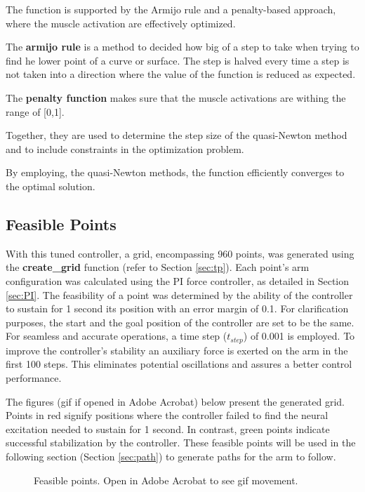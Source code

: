 The function is supported by the Armijo rule and a penalty-based approach, where the muscle activation are effectively optimized. 

The \textbf{armijo rule }is a method to decided how big of a step to take when trying to find he lower point of a curve or surface. 
The step is halved every time a step is not taken into a direction where the value of the function is reduced as expected. 

The \textbf{penalty function} makes sure that the muscle activations are withing the range of [0,1]. 

Together, they are used to determine the step size of the quasi-Newton method and to include constraints in the optimization problem. 

By employing, the quasi-Newton methods, the function efficiently converges to the optimal solution.             

\subsection{Feasible Points}
With this tuned controller, a grid, encompassing 960 points, was generated using the \textbf{create\_grid} function (refer to Section \ref{sec:tp}). Each point's arm configuration was calculated using the PI force controller, as detailed in Section \ref{sec:PI}. The feasibility of a point was determined by the ability of the controller to sustain for 1 second its position with an error margin of 0.1. For clarification purposes, the start and the goal position of the controller are set to be the same. 
For seamless and accurate operations, a time step (\(t_{step}\)) of 0.001 is employed. To improve the controller's stability an auxiliary force is exerted on the arm in the first 100 steps. This eliminates potential oscillations and assures a better control performance.

The figures (gif if opened in Adobe Acrobat) below present the generated grid. Points in red signify positions where the controller failed to find the neural excitation needed to sustain for 1 second. In contrast, green points indicate successful stabilization by the controller. These feasible points will be used in the following section (Section \ref{sec:path}) to generate paths for the arm to follow. 


\begin{figure}[ht]
    \centering
    \caption{Feasible points. Open in Adobe Acrobat to see gif movement.}
    \label{gif:Feasiblepoints}
\end{figure}


